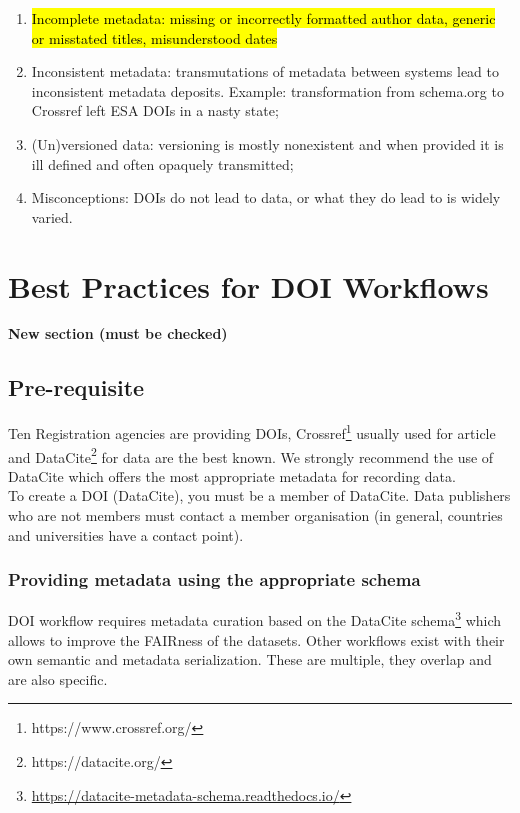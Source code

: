 \documentclass[11pt,a4paper]{ivoa}
\begin{document}
\begin{enumerate}
	\item %
	\hl{Incomplete metadata: missing or incorrectly formatted author data, generic or misstated titles, misunderstood dates}
	\item Inconsistent metadata: transmutations of metadata between systems lead to inconsistent metadata deposits. Example: transformation from schema.org to Crossref left ESA DOIs in a nasty state;
	\item (Un)versioned data: versioning is mostly nonexistent and when provided it is ill defined and often opaquely transmitted;
	\item Misconceptions: DOIs do not lead to data, or what they do lead to is widely varied.
\end{enumerate}



\section{Best Practices for DOI Workﬂows}
\textbf{\color{red}New section (must be checked)}

\subsection{Pre-requisite}
Ten Registration agencies are providing DOIs, Crossref\footnote{https://www.crossref.org/} usually used for article and DataCite\footnote{https://datacite.org/} for data are the best known. 
We strongly recommend the use of DataCite which offers the most appropriate metadata for recording data.\\

To create a DOI (DataCite), you must be a member of DataCite. Data publishers who are not members must contact a member organisation (in general, countries and universities have a contact point).


\subsubsection{Providing metadata using the appropriate schema}
\label{sec:bestpractice:providing}
DOI workflow requires metadata curation based on the DataCite schema\footnote{\url{https://datacite-metadata-schema.readthedocs.io/}} which allows to improve the FAIRness of the datasets. Other workflows exist with their own semantic and metadata serialization. These are multiple, they overlap and are also specific.
\end{document}
